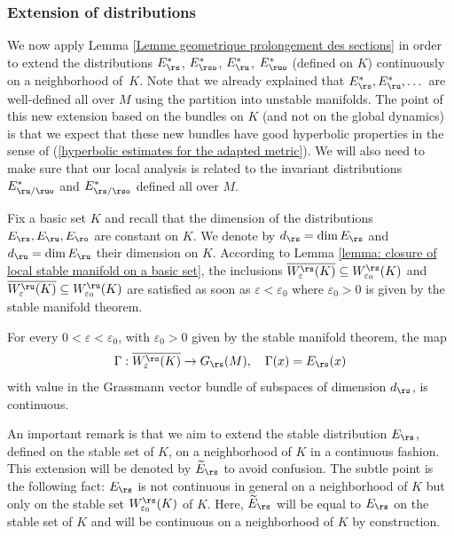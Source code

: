 \subsubsection{Extension of distributions} We now apply Lemma \ref{Lemme geometrique prolongement des sections} in order to extend the distributions $E_{\rs}^*$, $E_{\rso}^*$, $E_{\ru}^*$, $E_{\ruo}^*$ (defined on $K$) continuously on a neighborhood of~$K$. Note that we already explained that $E_\rs^*, E_\ru^*,\dots$ are well-defined all over $M$ using the partition into unstable manifolds. The point of this new extension based on the bundles on $K$ (and not on the global dynamics) is that we expect that these new bundles have good hyperbolic properties in the sense of (\ref{hyperbolic estimates for the adapted metric}). We will also need to make sure that our local analysis is related to the invariant distributions $E_{\ru/\ruo}^*$ and $E_{\rs/\rso}^*$ defined all over $M$.

Fix a basic set $K$ and recall that the dimension of the distributions $E_\rs, E_\ru, E_\ro$ are constant on $K$. We denote by $d_{\rs} = \dim E_\rs$ and $d_{\ru} = \dim E_\ru$ their dimension on $K$. According to Lemma \ref{lemma: closure of local stable manifold on a basic set}, the inclusions $\overline{W_{\varepsilon}^\rs (K)} \subseteq W_{\varepsilon_0}^\rs (K)$ and $\overline{W_{\varepsilon}^\ru (K)} \subseteq W_{\varepsilon_0}^\ru (K)$ are satisfied as soon as $\varepsilon < \varepsilon_0$ where $\varepsilon_0 > 0$ is given by the stable manifold theorem.

\begin{lemma}\label{lemma: continuity of extension of distributions}For every $0 < \varepsilon < \varepsilon_0$, with $\varepsilon_0 > 0$ given by the stable manifold theorem, the map
\[
\Gamma: \overline{W_{\varepsilon}^{\rs} (K)} \to G_{\rs}(M), \quad \Gamma(x) = E_\rs (x)
\]
with value in the Grassmann vector bundle of subspaces of dimension $d_{\rs}$, is continuous.
\end{lemma}

An important remark is that we aim to extend the stable distribution $E_\rs$, defined on the stable set of $K$, on a neighborhood of $K$ in a continuous fashion. This extension will be denoted by $\widetilde{E}_\rs$ to avoid confusion. The subtle point is the following fact: $E_\rs$ is not continuous in general on a neighborhood of $K$ but only on the stable set $W_{\varepsilon_0}^\rs (K)$ of $K$. Here, $\widetilde{E}_\rs$ will be equal to $E_\rs$ on the stable set of $K$ and will be continuous on a neighborhood of $K$ by construction.

